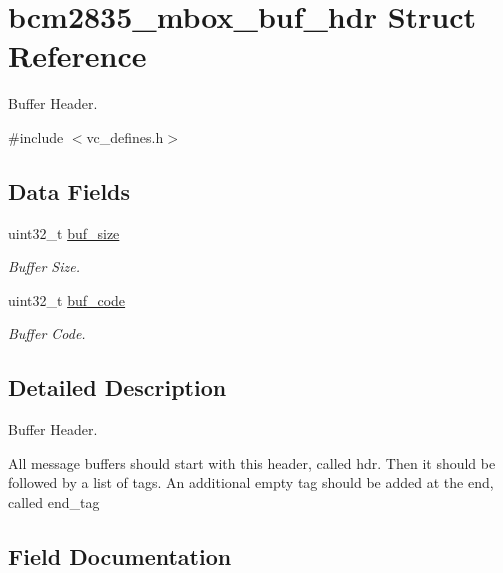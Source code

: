 \hypertarget{structbcm2835__mbox__buf__hdr}{}\section{bcm2835\+\_\+mbox\+\_\+buf\+\_\+hdr Struct Reference}
\label{structbcm2835__mbox__buf__hdr}


Buffer Header.  




{\ttfamily \#include $<$vc\+\_\+defines.\+h$>$}

\subsection*{Data Fields}
\begin{DoxyCompactItemize}
\item 
uint32\+\_\+t \mbox{\hyperlink{structbcm2835__mbox__buf__hdr_aee9a1bffb64d27b0560e7c52f83f4a66}{buf\+\_\+size}}
\begin{DoxyCompactList}\small\item\em Buffer Size. \end{DoxyCompactList}\item 
uint32\+\_\+t \mbox{\hyperlink{structbcm2835__mbox__buf__hdr_a3984f9f1b566f0e88542b002773ccd8b}{buf\+\_\+code}}
\begin{DoxyCompactList}\small\item\em Buffer Code. \end{DoxyCompactList}\end{DoxyCompactItemize}


\subsection{Detailed Description}
Buffer Header. 

All message buffers should start with this header, called \textquotesingle{}hdr\textquotesingle{}. Then it should be followed by a list of tags. An additional empty tag should be added at the end, called \textquotesingle{}end\+\_\+tag\textquotesingle{} 

\subsection{Field Documentation}
\mbox{\label{structbcm2835__mbox__buf__hdr_a3984f9f1b566f0e88542b002773ccd8b}} 

